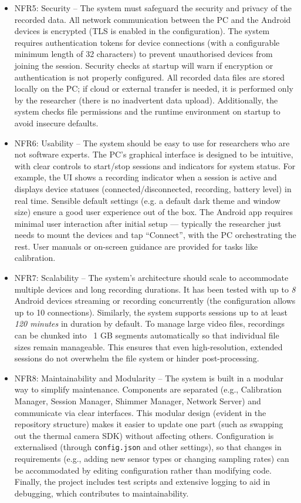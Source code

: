 \begin{itemize}
  \item NFR5: Security -- The system must safeguard the security and privacy of the recorded data. All network communication between the PC and the Android devices is encrypted (TLS is enabled in the configuration). The system requires authentication tokens for device connections (with a configurable minimum length of 32 characters) to prevent unauthorised devices from joining the session. Security checks at startup will warn if encryption or authentication is not properly configured. All recorded data files are stored locally on the PC; if cloud or external transfer is needed, it is performed only by the researcher (there is no inadvertent data upload). Additionally, the system checks file permissions and the runtime environment on startup to avoid insecure defaults.

  \item NFR6: Usability -- The system should be easy to use for researchers who are not software experts. The PC's graphical interface is designed to be intuitive, with clear controls to start/stop sessions and indicators for system status. For example, the UI shows a recording indicator when a session is active and displays device statuses (connected/disconnected, recording, battery level) in real time. Sensible default settings (e.g. a default dark theme and window size) ensure a good user experience out of the box. The Android app requires minimal user interaction after initial setup --- typically the researcher just needs to mount the devices and tap ``Connect'', with the PC orchestrating the rest. User manuals or on-screen guidance are provided for tasks like calibration.

  \item NFR7: Scalability -- The system's architecture should scale to accommodate multiple devices and long recording durations. It has been tested with up to \emph{8} Android devices streaming or recording concurrently (the configuration allows up to 10 connections). Similarly, the system supports sessions up to at least \emph{120 minutes} in duration by default. To manage large video files, recordings can be chunked into ~1 GB segments automatically so that individual file sizes remain manageable. This ensures that even high-resolution, extended sessions do not overwhelm the file system or hinder post-processing.

  \item NFR8: Maintainability and Modularity -- The system is built in a modular way to simplify maintenance. Components are separated (e.g., Calibration Manager, Session Manager, Shimmer Manager, Network Server) and communicate via clear interfaces. This modular design (evident in the repository structure) makes it easier to update one part (such as swapping out the thermal camera SDK) without affecting others. Configuration is externalised (through \texttt{config.json} and other settings), so that changes in requirements (e.g., adding new sensor types or changing sampling rates) can be accommodated by editing configuration rather than modifying code. Finally, the project includes test scripts and extensive logging to aid in debugging, which contributes to maintainability.
\end{itemize}

